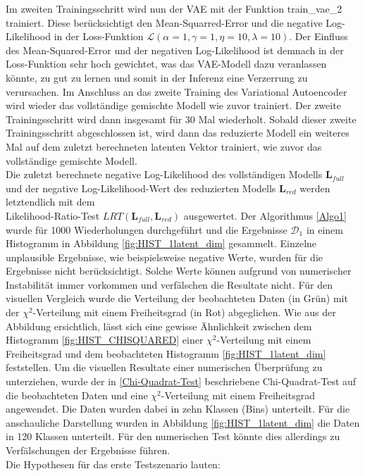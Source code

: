 \documentclass[%
thesis=student,%
coverpage=false,%
titlepage=false,%
headmarks=true, %
german,%
font=libertine, %
math=newpxtx, %
BCOR=5mm,%
coverBCOR=11mm%
]{tumbook}
\theoremstyle{break}
\begin{document}
Im zweiten Trainingsschritt wird nun der VAE mit der Funktion train\_vae\_2 trainiert. Diese berücksichtigt den Mean-Squarred-Error und die negative Log-Likelihood in der Loss-Funktion $\mathcal{L}(\alpha=1,\gamma=1,\eta=10,\lambda=10)$. Der Einfluss des Mean-Squared-Error und der negativen Log-Likelihood ist demnach in der Loss-Funktion sehr hoch gewichtet, was das VAE-Modell dazu veranlassen könnte, zu gut zu lernen und somit in der Inferenz eine Verzerrung zu verursachen. Im Anschluss an das zweite Training des Variational Autoencoder wird wieder das vollständige gemischte Modell wie zuvor trainiert. Der zweite Trainingsschritt wird dann insgesamt für 30 Mal wiederholt. Sobald dieser zweite Trainingsschritt abgeschlossen ist, wird dann das reduzierte Modell ein weiteres Mal auf dem zuletzt berechneten latenten Vektor trainiert, wie zuvor das vollständige gemischte Modell.\\
Die zuletzt berechnete negative Log-Likelihood des vollständigen Modells $\mathbf{L}_{full}$ und der negative Log-Likelihood-Wert des reduzierten Modells $\mathbf{L}_{red}$ werden letztendlich mit dem \\ Likelihood-Ratio-Test $LRT(\mathbf{L}_{full},\mathbf{L}_{red})$ ausgewertet. Der Algorithmus \ref{Algo1} wurde für 1000 Wiederholungen durchgeführt und die Ergebnisse $\mathcal{D}_1$ in einem Histogramm in Abbildung \ref{fig:HIST_1latent_dim} gesammelt. Einzelne unplausible Ergebnisse, wie beispielsweise negative Werte, wurden für die Ergebnisse nicht berücksichtigt. Solche Werte können aufgrund von numerischer Instabilität immer vorkommen und verfälschen die Resultate nicht. Für den visuellen Vergleich wurde die Verteilung der beobachteten Daten (in Grün) mit der $\chi^2$-Verteilung mit einem Freiheitsgrad (in Rot) abgeglichen. Wie aus der Abbildung ersichtlich, lässt sich eine gewisse Ähnlichkeit zwischen dem Histogramm \ref{fig:HIST_CHISQUARED} einer $\chi^2$-Verteilung mit einem Freiheitsgrad und dem beobachteten Histogramm \ref{fig:HIST_1latent_dim} feststellen. Um die visuellen Resultate einer numerischen Überprüfung zu unterziehen, wurde der in \ref{Chi-Quadrat-Test} beschriebene Chi-Quadrat-Test auf die beobachteten Daten und eine $\chi^2$-Verteilung mit einem Freiheitsgrad angewendet. Die Daten wurden dabei in zehn Klassen (Bins) unterteilt. Für die anschauliche Darstellung wurden in Abbildung \ref{fig:HIST_1latent_dim} die Daten in 120 Klassen unterteilt. Für den numerischen Test könnte dies allerdings zu Verfälschungen der Ergebnisse führen.\\
Die Hypothesen für das erste Testszenario lauten:\\
\end{document}
